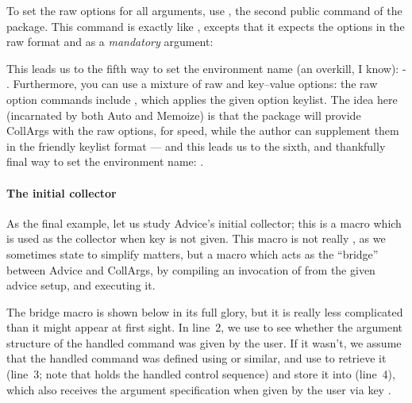 \documentclass[a4paper,11pt]{article}
\begin{document}
To set the raw options for all arguments, use , the
second public command of the package.  This command is exactly like
, excepts that it expects the options in the raw
format and as a \emph{mandatory} argument:

\begin{center}
  \textcolor{gray}{}
\end{center}

This leads us to the fifth way to set the environment name (an overkill, I
know): \hyp
{}.
Furthermore, you can use a mixture of raw and key--value options: the raw
option commands include , which applies the given option
keylist.  The idea here (incarnated by both Auto and Memoize) is that the
package will provide CollArgs with the raw options, for speed, while the
author can supplement them in the friendly keylist format --- and this leads
us to the sixth, and thankfully final way to set the environment name:
.


\paragraph{The initial collector}

As the final example, let us study Advice's initial collector; this is a macro
which is used as the collector when key  is not given.
This macro is not really , as we sometimes state to
simplify matters, but a macro which acts as the ``bridge'' between Advice and
CollArgs, by compiling an invocation of  from the
given advice setup, and executing it.

The bridge macro is shown below in its full glory, but it is really less
complicated than it might appear at first sight.  In line~2, we use
 to see whether the argument structure of the handled
command was given by the user.  If it wasn't, we assume that the handled
command was defined using  or similar, and use
 to retrieve it (line~3; note that
 holds the handled control sequence) and store it into
 (line~4), which also receives the argument specification
when given by the user via key .
\end{document}
